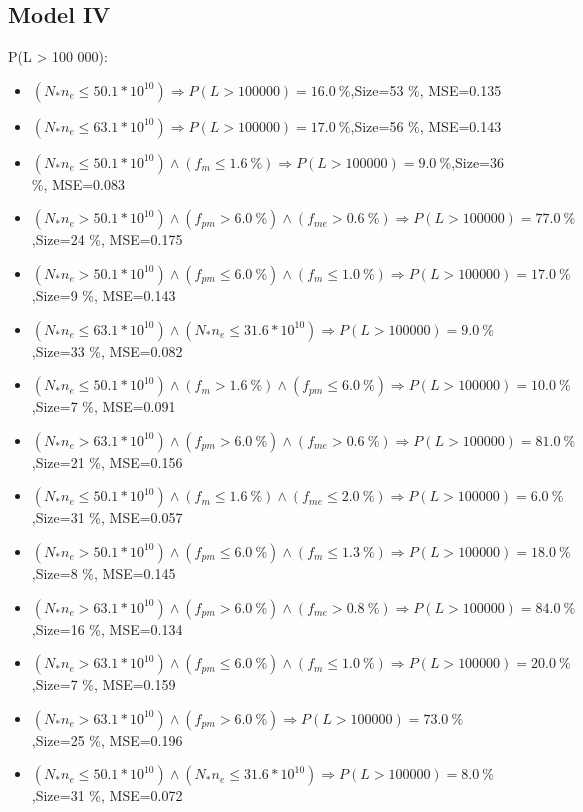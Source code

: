 \documentclass[numbered]{CSL}
\begin{document}
\subsection{Model IV}
P(L > 100 000):
\begin{itemize}
\item $(N_* n_e \leq 50.1 * 10^{10}) \Rightarrow P(L > 100 000) = 16.0~\%$,\hfill Size=53 \%, MSE=0.135
\item $(N_* n_e \leq 63.1 * 10^{10}) \Rightarrow P(L > 100 000) = 17.0~\%$,\hfill Size=56 \%, MSE=0.143
\item $(N_* n_e \leq 50.1 * 10^{10}) \land (f_m \leq 1.6~\%) \Rightarrow P(L > 100 000) = 9.0~\%$,\hfill Size=36 \%, MSE=0.083
\item $(N_* n_e > 50.1 * 10^{10}) \land (f_{pm} > 6.0~\%) \land (f_{me} > 0.6~\%) \Rightarrow P(L > 100 000) = 77.0~\%$,\hfill Size=24 \%, MSE=0.175
\item $(N_* n_e > 50.1 * 10^{10}) \land (f_{pm} \leq 6.0~\%) \land (f_m \leq 1.0~\%) \Rightarrow P(L > 100 000) = 17.0~\%$,\hfill Size=9 \%, MSE=0.143
\item $(N_* n_e \leq 63.1 * 10^{10}) \land (N_* n_e \leq 31.6 * 10^{10}) \Rightarrow P(L > 100 000) = 9.0~\%$,\hfill Size=33 \%, MSE=0.082
\item $(N_* n_e \leq 50.1 * 10^{10}) \land (f_m > 1.6~\%) \land (f_{pm} \leq 6.0~\%) \Rightarrow P(L > 100 000) = 10.0~\%$,\hfill Size=7 \%, MSE=0.091
\item $(N_* n_e > 63.1 * 10^{10}) \land (f_{pm} > 6.0~\%) \land (f_{me} > 0.6~\%) \Rightarrow P(L > 100 000) = 81.0~\%$,\hfill Size=21 \%, MSE=0.156
\item $(N_* n_e \leq 50.1 * 10^{10}) \land (f_m \leq 1.6~\%) \land (f_{me} \leq 2.0~\%) \Rightarrow P(L > 100 000) = 6.0~\%$,\hfill Size=31 \%, MSE=0.057
\item $(N_* n_e > 50.1 * 10^{10}) \land (f_{pm} \leq 6.0~\%) \land (f_m \leq 1.3~\%) \Rightarrow P(L > 100 000) = 18.0~\%$,\hfill Size=8 \%, MSE=0.145
\item $(N_* n_e > 63.1 * 10^{10}) \land (f_{pm} > 6.0~\%) \land (f_{me} > 0.8~\%) \Rightarrow P(L > 100 000) = 84.0~\%$,\hfill Size=16 \%, MSE=0.134
\item $(N_* n_e > 63.1 * 10^{10}) \land (f_{pm} \leq 6.0~\%) \land (f_m \leq 1.0~\%) \Rightarrow P(L > 100 000) = 20.0~\%$,\hfill Size=7 \%, MSE=0.159
\item $(N_* n_e > 63.1 * 10^{10}) \land (f_{pm} > 6.0~\%) \Rightarrow P(L > 100 000) = 73.0~\%$,\hfill Size=25 \%, MSE=0.196
\item $(N_* n_e \leq 50.1 * 10^{10}) \land (N_* n_e \leq 31.6 * 10^{10}) \Rightarrow P(L > 100 000) = 8.0~\%$,\hfill Size=31 \%, MSE=0.072

\end{itemize}
\end{document}
